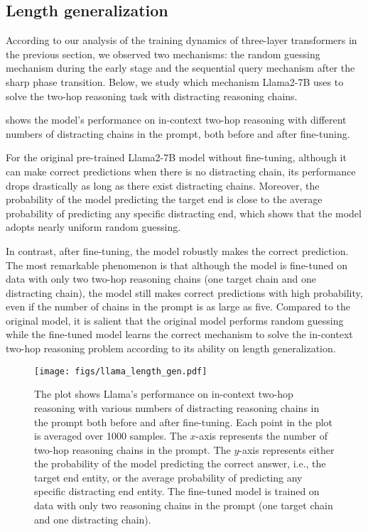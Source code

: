 \subsection{Length generalization}
\label{subsec:length_gen}

According to our analysis of the training dynamics of three-layer transformers in the previous section, we observed two mechanisms: the random guessing mechanism during the early stage and the sequential query mechanism after the sharp phase transition. Below, we study which mechanism Llama2-7B uses to solve the two-hop reasoning task with distracting reasoning chains. 

 shows the model's performance on in-context two-hop reasoning with different numbers of distracting chains in the prompt, both before and after fine-tuning. 

For the original pre-trained Llama2-7B model without fine-tuning, although it can make correct predictions when there is no distracting chain, its performance drops drastically as long as there exist distracting chains. Moreover, the probability of the model predicting the target end is close to the average probability of predicting any specific distracting end, which shows that the model adopts nearly uniform random guessing.  

In contrast, after fine-tuning, the model robustly makes the correct prediction. The most remarkable phenomenon is that although the model is fine-tuned on data with only two two-hop reasoning chains (one target chain and one distracting chain), the model still makes correct predictions with high probability, even if the number of chains in the prompt is as large as five. Compared to the original model, it is salient that the original model performs random guessing while the fine-tuned model learns the correct mechanism to solve the in-context two-hop reasoning problem according to its ability on length generalization.

\begin{figure}[h]
    \centering
    \texttt{[image: figs/llama\_length\_gen.pdf]}
    \caption{The plot shows Llama's performance on in-context two-hop reasoning with various numbers of distracting reasoning chains in the prompt both before and after fine-tuning. Each point in the plot is averaged over 1000 samples. The $x$-axis represents the number of two-hop reasoning chains in the prompt. The $y$-axis represents either the probability of the model predicting the correct answer, i.e., the target end entity, or the average probability of predicting any specific distracting end entity. The fine-tuned model is trained on data with only two reasoning chains in the prompt (one target chain and one distracting chain).}
    \label{fig:llm-length-gen}
\end{figure}